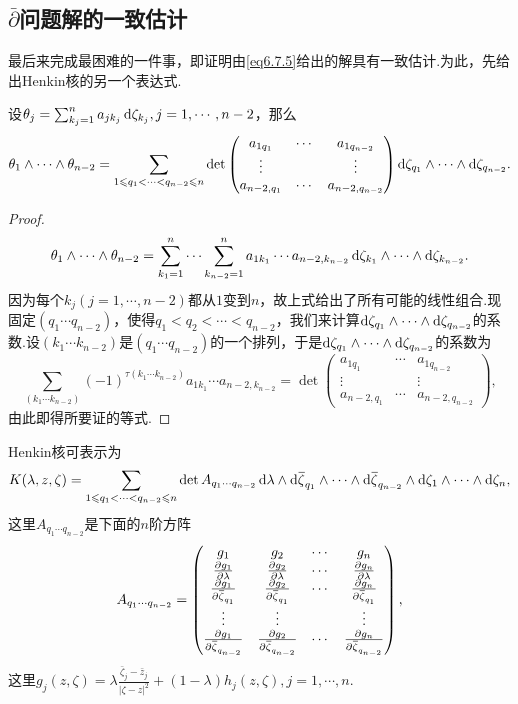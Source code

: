 \subsection{$\bar{\partial}$问题解的一致估计}
最后来完成最困难的一件事，即证明由\eqref{eq6.7.5}给出的解具有一致估计.为此，先给出Henkin核的另一个表达式.
\begin{lemma}\label{lem6.7.8}
	设$\theta_j=\sum_{k_j=1}^{n}a_{jk_j}\mathop{}\!\mathrm{d}\zeta_{k_j},j=1,\cdots,n-2$，那么
	\[\theta_1\wedge\cdots\wedge\theta_{n-2}
	=\sum_{1\leqslant q_1<\cdots<q_{n-2}\leqslant n}\det\begin{pmatrix}
		a_{1q_1} & \cdots & a_{1q_{n-2}}\\
		\vdots & & \vdots\\
		a_{n-2,q_1} & \cdots & a_{n-2,q_{n-2}}
	\end{pmatrix}\mathop{}\!\mathrm{d}\zeta_{q_1}\wedge\cdots\wedge\mathop{}\!\mathrm{d}\zeta_{q_{n-2}}.\]
\end{lemma}
\begin{proof}
	\[\theta_1\wedge\cdots\wedge\theta_{n-2}=\sum_{k_1=1}^{n}\cdots\sum_{k_{n-2}=1}^{n}a_{1k_1}\cdots a_{n-2,k_{n-2}}\mathop{}\!\mathrm{d}\zeta_{k_1}\wedge\cdots\wedge\mathop{}\!\mathrm{d}\zeta_{k_{n-2}}.\]
	因为每个$k_j(j=1,\cdots,n-2)$都从$1$变到$n$，故上式给出了所有可能的线性组合.现固定$(q_1\cdots q_{n-2})$，使得$q_1<q_2<\cdots<q_{n-2}$，我们来计算$\mathop{}\!\mathrm{d}\zeta_{q_1}\wedge\cdots\wedge\mathop{}\!\mathrm{d}\zeta_{q_{n-2}}$的系数.设$(k_1\cdots k_{n-2})$是$(q_1\cdots q_{n-2})$的一个排列，于是$\mathop{}\!\mathrm{d}\zeta_{q_1}\wedge\cdots\wedge\mathop{}\!\mathrm{d}\zeta_{q_{n-2}}$的系数为
	\[\sum_{(k_1\cdots k_{n-2})}(-1)^{\tau(k_1\cdots k_{n-2})}a_{1k_1}\cdots a_{n-2,k_{n-2}}=\det\begin{pmatrix}
		a_{1q_1} & \cdots & a_{1q_{n-2}}\\
		\vdots & & \vdots\\
		a_{n-2,q_1} & \cdots & a_{n-2,q_{n-2}}
	\end{pmatrix},\]
	由此即得所要证的等式.
\end{proof}
\begin{lemma}\label{lem6.7.9}
	Henkin核可表示为
	\[K(\lambda,z,\zeta)=\sum_{1\leqslant q_1<\cdots<q_{n-2}\leqslant n}\det A_{q_1\cdots q_{n-2}}\mathop{}\!\mathrm{d}\lambda\wedge\mathop{}\!\mathrm{d}{}\mkern1mu\overline{\mkern-1mu\zeta}_{q_1}\wedge\cdots\wedge\mathop{}\!\mathrm{d}{}\mkern1mu\overline{\mkern-1mu\zeta}_{q_{n-2}}\wedge\mathop{}\!\mathrm{d}\zeta_1\wedge\cdots\wedge\mathop{}\!\mathrm{d}\zeta_n,\]
	这里$A_{q_1\cdots q_{n-2}}$是下面的$n$阶方阵
	\[A_{q_1\cdots q_{n-2}}
	=\begin{pmatrix}
		g_1 & g_2 & \cdots & g_n\\
		\frac{\partial g_1}{\partial \lambda} & \frac{\partial g_2}{\partial \lambda} & \cdots & \frac{\partial g_n}{\partial \lambda}\\
		\frac{\partial g_1}{\partial {}\mkern1mu\overline{\mkern-1mu\zeta}_{q_1}} & \frac{\partial g_2}{\partial {}\mkern1mu\overline{\mkern-1mu\zeta}_{q_1}} & \cdots &\frac{\partial g_n}{\partial {}\mkern1mu\overline{\mkern-1mu\zeta}_{q_1}}\\
		\vdots & \vdots & & \vdots\\
		\frac{\partial g_1}{\partial {}\mkern1mu\overline{\mkern-1mu\zeta}_{q_{n-2}}} & \frac{\partial g_2}{\partial {}\mkern1mu\overline{\mkern-1mu\zeta}_{q_{n-2}}} &\cdots &\frac{\partial g_n}{\partial {}\mkern1mu\overline{\mkern-1mu\zeta}_{q_{n-2}}}
	\end{pmatrix},\]
	这里$g_j(z,\zeta)=\lambda\frac{\bar{\zeta}_j-\bar{z}_j}{|\zeta-z|^2}+(1-\lambda)h_j(z,\zeta),j=1,\cdots,n$.
\end{lemma}
